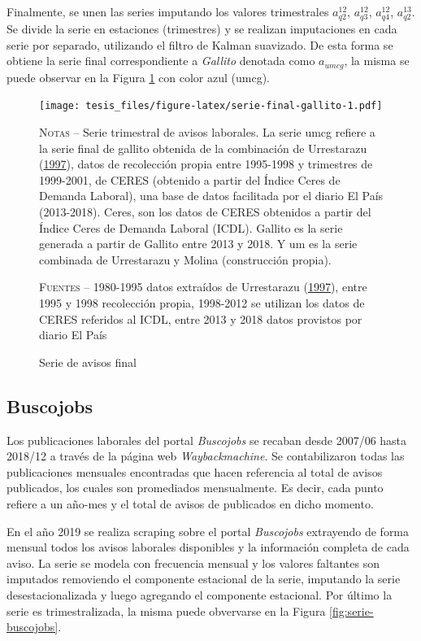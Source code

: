 \documentclass[12pt,oneside]{reedthesis}
\begin{document}
Finalmente, se unen las series imputando los valores trimestrales \(a_{q2}^{12}\), \(a_{q3}^{12}\), \(a_{q4}^{12}\), \(a_{q2}^{13}\). Se divide la serie en estaciones (trimestres) y se realizan imputaciones en cada serie por separado, utilizando el filtro de Kalman suavizado. De esta forma se obtiene la serie final correspondiente a \emph{Gallito} denotada como \(a_{umcg}\), la misma se puede observar en la Figura \ref{fig:serie-final-gallito} con color azul (umcg).
\begin{figure}
\texttt{[image: tesis\_files/figure-latex/serie-final-gallito-1.pdf]}
\caption{Serie de avisos final}\label{fig:serie-final-gallito}\textsc{}

\footnotesize\textsc{Notas} -- Serie trimestral de avisos laborales. La serie umcg refiere a la serie final de gallito obtenida de la combinación de Urrestarazu (\protect\hyperlink{ref-Urrestarazu1997}{1997}), datos de recolección propia entre 1995-1998 y trimestres de 1999-2001, de CERES (obtenido a partir del Índice Ceres de Demanda Laboral), una base de datos facilitada por el diario El País (2013-2018). Ceres, son los datos de CERES obtenidos a partir del Índice Ceres de Demanda Laboral (ICDL). Gallito es la serie generada a partir de Gallito entre 2013 y 2018. Y um es la serie combinada de Urrestarazu y Molina (construcción propia).

\textsc{Fuentes} -- 1980-1995 datos extraídos de Urrestarazu (\protect\hyperlink{ref-Urrestarazu1997}{1997}), entre 1995 y 1998 recolección propia, 1998-2012 se utilizan los datos de CERES referidos al ICDL, entre 2013 y 2018 datos provistos por diario El País
\end{figure}
\hypertarget{buscojobs}{%
\subsection{Buscojobs}\label{buscojobs}}

Los publicaciones laborales del portal \emph{Buscojobs} se recaban desde 2007/06 hasta 2018/12 a través de la página web \emph{Waybackmachine}. Se contabilizaron todas las publicaciones mensuales encontradas que hacen referencia al total de avisos publicados, los cuales son promediados mensualmente. Es decir, cada punto refiere a un año-mes y el total de avisos de publicados en dicho momento.

En el año 2019 se realiza scraping sobre el portal \emph{Buscojobs} extrayendo de forma mensual todos los avisos laborales disponibles y la información completa de cada aviso. La serie se modela con frecuencia mensual y los valores faltantes son imputados removiendo el componente estacional de la serie, imputando la serie desestacionalizada y luego agregando el componente estacional. Por último la serie es trimestralizada, la misma puede obvervarse en la Figura \ref{fig:serie-buscojobs}.
\end{document}
